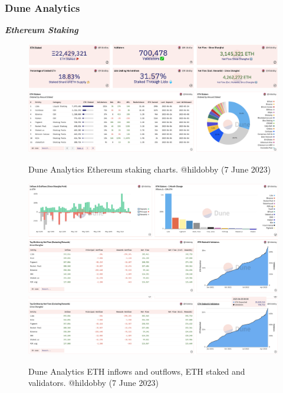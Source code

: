 \documentclass[UTF8]{article}
\begin{document}
{\clearpage
\subsubsection*{Dune Analytics}
\textit{\textbf{Ethereum Staking}}
\begin{figure}[htbp]
\begin{center}
\includegraphics[width=\linewidth]{images/hildobby1}\\
\includegraphics[width=\linewidth]{images/hildobby2}
\caption{Dune Analytics Ethereum staking charts. @hildobby  (7 June 2023)}
\label{fig:hildobby1}
\end{center}
\end{figure}

\begin{figure}[htbp]
\begin{center}
\includegraphics[width=\linewidth]{images/hildobby3}\\
\includegraphics[width=\linewidth]{images/hildobby4}
\caption{Dune Analytics ETH inflows and outflows, ETH staked and validators. @hildobby  (7 June 2023)}
\label{fig:hildobby3}
\end{center}
\end{figure}


}
\end{document}
